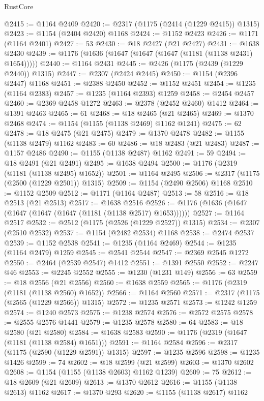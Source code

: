 \begin{lexlean}{RustCore}
\begin{coremodule}
@2415 := @1164 @2409
@2420 := @2317 (@1175 (@2414 (@1229 @2415)) @1315)
@2423 := @1154 (@2404 @2420) @1168
@2424 := @1152 @2423
@2426 := @1171 (@1164 @2401)
@2427 := 53
@2430 := @18 @2427 (@21 @2427)
@2431 := @1638 @2430
@2439 := @1176 (@1636 (@1647 (@1647 (@1647 (@1181 (@1138 @2431) @1654)))))
@2440 := @1164 @2431
@2445 := @2426 (@1175 (@2439 (@1229 @2440)) @1315)
@2447 := @2307 (@2424 @2445)
@2450 := @1154 (@2396 @2447) @1168
@2451 := @2388 @2450
@2452 := @1152 @2451
@2454 := @1235 (@1164 @2383)
@2457 := @1235 (@1164 @2393) @1259
@2458 := @2454 @2457
@2460 := @2369 @2458 @1272
@2463 := @2378 (@2452 @2460) @1412
@2464 := @1391 @2463
@2465 := 61
@2468 := @18 @2465 (@21 @2465)
@2469 := @1370 @2468
@2474 := @1154 (@1155 (@1138 @2469) @1162 @1241)
@2475 := 62
@2478 := @18 @2475 (@21 @2475)
@2479 := @1370 @2478
@2482 := @1155 (@1138 @2479) @1162
@2483 := 60
@2486 := @18 @2483 (@21 @2483)
@2487 := @1157 @2486
@2490 := @1155 (@1138 @2487) @1162
@2491 := 59
@2494 := @18 @2491 (@21 @2491)
@2495 := @1638 @2494
@2500 := @1176 (@2319 (@1181 (@1138 @2495) @1652))
@2501 := @1164 @2495
@2506 := @2317 (@1175 (@2500 (@1229 @2501)) @1315)
@2509 := @1154 (@2490 @2506) @1168
@2510 := @1152 @2509
@2512 := @1171 (@1164 @2487)
@2513 := 58
@2516 := @18 @2513 (@21 @2513)
@2517 := @1638 @2516
@2526 := @1176 (@1636 (@1647 (@1647 (@1647 (@1647 (@1181 (@1138 @2517) @1653))))))
@2527 := @1164 @2517
@2532 := @2512 (@1175 (@2526 (@1229 @2527)) @1315)
@2534 := @2307 (@2510 @2532)
@2537 := @1154 (@2482 @2534) @1168
@2538 := @2474 @2537
@2539 := @1152 @2538
@2541 := @1235 (@1164 @2469)
@2544 := @1235 (@1164 @2479) @1259
@2545 := @2541 @2544
@2547 := @2369 @2545 @1272
@2550 := @2464 (@2539 @2547) @1412
@2551 := @1391 @2550
@2552 := @2247 @46
@2553 := @2245 @2552
@2555 := @1230 (@1231 @149)
@2556 := 63
@2559 := @18 @2556 (@21 @2556)
@2560 := @1638 @2559
@2565 := @1176 (@2319 (@1181 (@1138 @2560) @1652))
@2566 := @1164 @2560
@2571 := @2317 (@1175 (@2565 (@1229 @2566)) @1315)
@2572 := @1235 @2571
@2573 := @1242 @1259
@2574 := @1240 @2573
@2575 := @1238 @2574
@2576 := @2572 @2575
@2578 := @2555 @2576 @1441
@2579 := @1235 @2578
@2580 := 64
@2583 := @18 @2580 (@21 @2580)
@2584 := @1638 @2583
@2590 := @1176 (@2319 (@1647 (@1181 (@1138 @2584) @1651)))
@2591 := @1164 @2584
@2596 := @2317 (@1175 (@2590 (@1229 @2591)) @1315)
@2597 := @1235 @2596
@2598 := @1235 @1426
@2599 := 74
@2602 := @18 @2599 (@21 @2599)
@2603 := @1370 @2602
@2608 := @1154 (@1155 (@1138 @2603) @1162 @1239)
@2609 := 75
@2612 := @18 @2609 (@21 @2609)
@2613 := @1370 @2612
@2616 := @1155 (@1138 @2613) @1162
@2617 := @1370 @293
@2620 := @1155 (@1138 @2617) @1162

\end{coremodule}
\end{lexlean}
